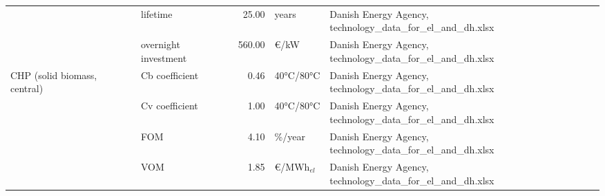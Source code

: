 \begin{longtable}{p{4cm}p{4cm}rp{3cm}p{10cm}}
                      & lifetime &        25.00 &                         years &                                                                                                                                                                                                                                                                        Danish Energy Agency, technology\_data\_for\_el\_and\_dh.xlsx \\
                      & overnight investment &       560.00 &                      \euro/kW &                                                                                                                                                                                                                                                                        Danish Energy Agency, technology\_data\_for\_el\_and\_dh.xlsx \\
CHP (solid biomass, central) & Cb coefficient &         0.46 &                     40°C/80°C &                                                                                                                                                                                                                                                                        Danish Energy Agency, technology\_data\_for\_el\_and\_dh.xlsx \\
                      & Cv coefficient &         1.00 &                     40°C/80°C &                                                                                                                                                                                                                                                                        Danish Energy Agency, technology\_data\_for\_el\_and\_dh.xlsx \\
                      & FOM &         4.10 &                       \%/year &                                                                                                                                                                                                                                                                        Danish Energy Agency, technology\_data\_for\_el\_and\_dh.xlsx \\
                      & VOM &         1.85 &              \euro/MWh$_{el}$ &                                                                                                                                                                                                                                                                        Danish Energy Agency, technology\_data\_for\_el\_and\_dh.xlsx \\

\end{longtable}
